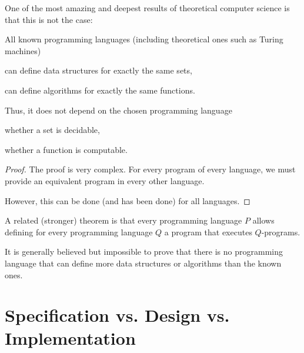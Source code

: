 One of the most amazing and deepest results of theoretical computer science is that this is not the case:

\begin{theorem}
All known programming languages (including theoretical ones such as Turing machines)
\begin{compactitem}
\item can define data structures for exactly the same sets,
\item can define algorithms for exactly the same functions.
\end{compactitem}

Thus, it does not depend on the chosen programming language
\begin{compactitem}
\item whether a set is decidable,
\item whether a function is computable.
\end{compactitem}
\end{theorem}
\begin{proof}
The proof is very complex.
For every program of every language, we must provide an equivalent program in every other language.

However, this can be done (and has been done) for all languages.
\end{proof}

A related (stronger) theorem is that every programming language $P$ allows defining for every programming language $Q$ a program that executes $Q$-programs.

It is generally believed but impossible to prove that there is no programming language that can define more data structures or algorithms than the known ones.

\section{Specification vs. Design vs. Implementation}

